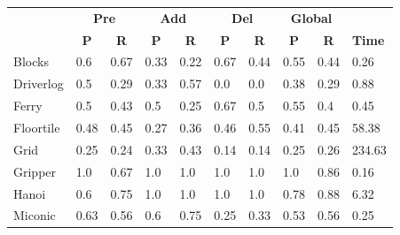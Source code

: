 \begin{table}[hbt!]
  \begin{center}
    \begin{footnotesize}
		\begin{tabular}{l|l|l|l|l|l|l||l|l||l|}
			& \multicolumn{2}{|c|}{\bf Pre} & \multicolumn{2}{|c|}{\bf Add} & \multicolumn{2}{|c||}{\bf Del} & \multicolumn{2}{|c|}{\bf Global} & \\ \cline{2-9}			
			& \multicolumn{1}{|c|}{\bf P} & \multicolumn{1}{|c|}{\bf R} & \multicolumn{1}{|c|}{\bf P} & \multicolumn{1}{|c|}{\bf R} & \multicolumn{1}{|c|}{\bf P} & \multicolumn{1}{|c||}{\bf R} &  \multicolumn{1}{|c|}{\bf P} & \multicolumn{1}{|c|}{\bf R} & {\bf Time} \\
			\hline
			Blocks & 0.6 & 0.67 & 0.33 & 0.22 & 0.67 & 0.44 & 0.55 & 0.44& 0.26 \\ %
			Driverlog & 0.5 & 0.29 & 0.33 & 0.57 & 0.0 & 0.0 & 0.38 & 0.29& 0.88 \\ %
			Ferry & 0.5 & 0.43 & 0.5 & 0.25 & 0.67 & 0.5 & 0.55 & 0.4& 0.45 \\ %
			Floortile & 0.48 & 0.45 & 0.27 & 0.36 & 0.46 & 0.55 & 0.41 & 0.45& 58.38 \\ %
			Grid & 0.25 & 0.24 & 0.33 & 0.43 & 0.14 & 0.14 & 0.25 & 0.26& 234.63 \\ %
			Gripper & 1.0 & 0.67 & 1.0 & 1.0 & 1.0 & 1.0 & 1.0 & 0.86& 0.16 \\ %
			Hanoi & 0.6 & 0.75 & 1.0 & 1.0 & 1.0 & 1.0 & 0.78 & 0.88& 6.32 \\ %
			Miconic & 0.63 & 0.56 & 0.6 & 0.75 & 0.25 & 0.33 & 0.53 & 0.56& 0.25 \\ %

\end{tabular}
\end{footnotesize}
\end{center}
\end{table}
